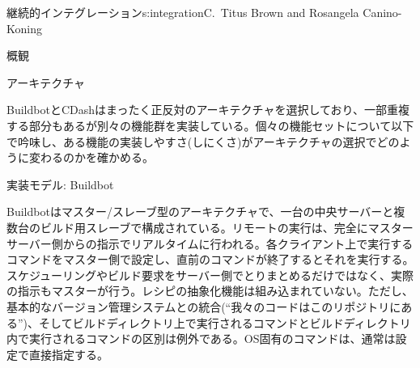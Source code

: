 \begin{aosachapter}{継続的インテグレーション}{s:integration}{C.\ Titus Brown and Rosangela Canino-Koning}
\begin{aosasect1}{概観}
\end{aosasect1}

\begin{aosasect1}{アーキテクチャ}

BuildbotとCDashはまったく正反対のアーキテクチャを選択しており、一部重複する部分もあるが別々の機能群を実装している。個々の機能セットについて以下で吟味し、ある機能の実装しやすさ(しにくさ)がアーキテクチャの選択でどのように変わるのかを確かめる。

\begin{aosasect2}{実装モデル: Buildbot}


Buildbotはマスター/スレーブ型のアーキテクチャで、一台の中央サーバーと複数台のビルド用スレーブで構成されている。リモートの実行は、完全にマスターサーバー側からの指示でリアルタイムに行われる。各クライアント上で実行するコマンドをマスター側で設定し、直前のコマンドが終了するとそれを実行する。スケジューリングやビルド要求をサーバー側でとりまとめるだけではなく、実際の指示もマスターが行う。レシピの抽象化機能は組み込まれていない。ただし、基本的なバージョン管理システムとの統合(``我々のコードはこのリポジトリにある'')、そしてビルドディレクトリ上で実行されるコマンドとビルドディレクトリ内で実行されるコマンドの区別は例外である。OS固有のコマンドは、通常は設定で直接指定する。


\end{aosasect2}
\end{aosasect1}
\end{aosachapter}
